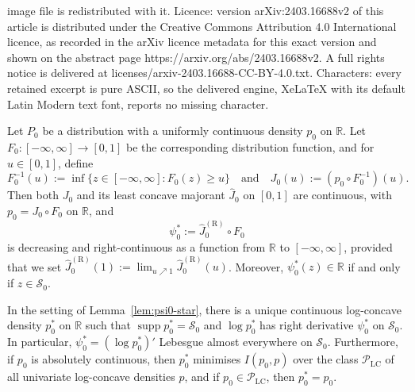 \documentclass[10pt,a4paper]{amsart}
\DeclareMathOperator{\supp}{supp}
\newcommand{\R}{\mathbb{R}}
\begin{document}
image file is redistributed with it. Licence: version arXiv:2403.16688v2 of this article is distributed under the Creative Commons Attribution 4.0 International licence, as recorded in the arXiv licence metadata for this exact version and shown on the abstract page https://arxiv.org/abs/2403.16688v2. A full rights notice is delivered at licenses/arxiv-2403.16688-CC-BY-4.0.txt. Characters: every retained excerpt is pure ASCII, so the delivered engine, XeLaTeX with its default Latin Modern text font, reports no missing character.
\begin{lemma}
\label{lem:psi0-star}
Let $P_0$ be a distribution with a uniformly continuous density $p_0$ on $\R$. Let $F_0 \colon [-\infty,\infty] \to [0,1]$ be the corresponding distribution function, and for $u \in [0,1]$, define
\[
F_0^{-1}(u) := \inf\{z \in [-\infty,\infty] : F_0(z) \geq u\} \quad\text{and}\quad J_0(u) := (p_0 \circ F_0^{-1})(u).
\] 
Then both $J_0$ and its least concave majorant $\hat{J}_0$ on $[0,1]$ are continuous, with $p_0 = J_0 \circ F_0$ on $\R$, and
\[
\psi_0^* := \hat{J}_0^{(\mathrm{R})} \circ F_0
\]
is decreasing and right-continuous as a function from $\R$ to $[-\infty,\infty]$, provided that we set $\hat{J}_0^{(\mathrm{R})}(1) := \lim_{u \nearrow 1}\hat{J}_0^{(\mathrm{R})}(u)$.
Moreover, $\psi_0^*(z) \in \R$ if and only if $z \in \mathcal{S}_0$.
\end{lemma}

\begin{lemma}
\label{lem:p0-star}
In the setting of Lemma~\ref{lem:psi0-star}, there is a unique continuous log-concave density $p_0^*$ on $\R$ such that $\supp p_0^* = \mathcal{S}_0$ and $\log p_0^*$ has right derivative $\psi_0^*$ on $\mathcal{S}_0$. In particular, $\psi_0^* = (\log p_0^*)'$ Lebesgue almost everywhere on $\mathcal{S}_0$.  Furthermore, if $p_0$ is absolutely continuous, then $p_0^*$ minimises $I(p_0,p)$ over the class $\mathcal{P}_{\mathrm{LC}}$ of all univariate log-concave densities $p$, and if $p_0 \in \mathcal{P}_{\mathrm{LC}}$, then $p_0^* = p_0$.
\end{lemma} 
\end{document}
